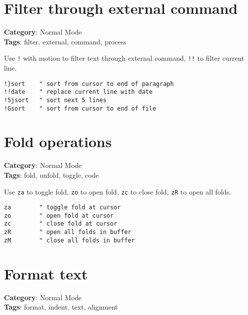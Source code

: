 {{{{{{{{{\section{Filter through external command}

\textbf{Category}: Normal Mode\\ \textbf{Tags}: filter, external, command, process
\vspace{0.5cm}

Use {\footnotesize \Verb§!§} with motion to filter text through external command, {\footnotesize \Verb§!!§} to filter current line.

\begin{Exa*}{}
\begin{Verbatim}[fontsize=\footnotesize, breaklines, breakanywhere]
!}sort    " sort from cursor to end of paragraph
!!date    " replace current line with date
!5jsort   " sort next 5 lines
!Gsort    " sort from cursor to end of file
\end{Verbatim}
\end{Exa*}

\section{Fold operations}

\textbf{Category}: Normal Mode\\ \textbf{Tags}: fold, unfold, toggle, code
\vspace{0.5cm}

Use {\footnotesize \Verb§za§} to toggle fold, {\footnotesize \Verb§zo§} to open fold, {\footnotesize \Verb§zc§} to close fold, {\footnotesize \Verb§zR§} to open all folds.

\begin{Exa*}{}
\begin{Verbatim}[fontsize=\footnotesize, breaklines, breakanywhere]
za        " toggle fold at cursor
zo        " open fold at cursor
zc        " close fold at cursor
zR        " open all folds in buffer
zM        " close all folds in buffer
\end{Verbatim}
\end{Exa*}

\section{Format text}

\textbf{Category}: Normal Mode\\ \textbf{Tags}: format, indent, text, alignment
\vspace{0.5cm}

}}}}}}}}}
